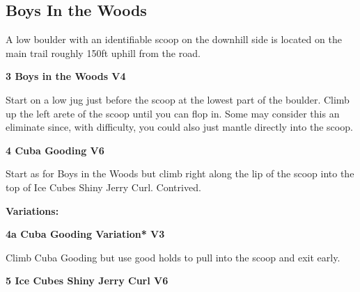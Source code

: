 	\begin{multicols}{2}


\needspace{1.5cm}
\subsection*{Boys In the Woods}\label{bf:Boys In the Woods}
A low boulder with an identifiable scoop on the downhill side is located on the main trail roughly 150ft uphill from the road.\\
	


\needspace{1.5cm}
\label{rt:Boys in the Woods}
\colorbox{RoyalBlue!20}{
\parbox{0.95\linewidth}{
\textbf{
3 Boys in the Woods V4  
}}}

\begin{adjustwidth}{0.5cm}{}			
Start on a low jug just before the scoop at the lowest part of the boulder. Climb up the left arete of the scoop until you can flop in. Some may consider this an eliminate since, with difficulty, you could also just mantle directly into the scoop.
\end{adjustwidth}



\needspace{1.5cm}
\label{rt:Cuba Gooding}
\colorbox{RoyalBlue!20}{
\parbox{0.95\linewidth}{
\textbf{
4 Cuba Gooding V6  
}}}

\begin{adjustwidth}{0.5cm}{}			
Start as for Boys in the Woods but climb right along the lip of the scoop into the top of Ice Cubes Shiny Jerry Curl. Contrived.
\end{adjustwidth}

\begin{adjustwidth}{0.5cm}{}				
\needspace{3cm}
\textbf{Variations:} \newline

\needspace{1.5cm}
\label{vr:Cuba Gooding Variation}
\colorbox{green!20}{
\parbox{0.95\linewidth}{
\textbf{
4a Cuba Gooding Variation* V3  
}}}

\begin{adjustwidth}{0.5cm}{}			
Climb Cuba Gooding but use good holds to pull into the scoop and exit early.
\end{adjustwidth}


\end{adjustwidth}


\needspace{1.5cm}
\label{rt:Ice Cubes Shiny Jerry Curl}
\colorbox{RoyalBlue!20}{
\parbox{0.95\linewidth}{
\textbf{
5 Ice Cubes Shiny Jerry Curl V6  
}}}


\end{multicols}
